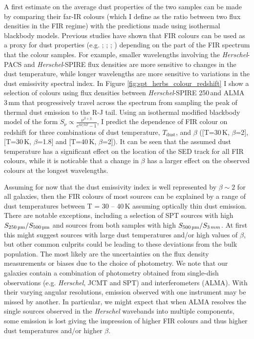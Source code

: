 A first estimate on the average dust properties of the two samples can be made by comparing their far-IR colours (which I define as the ratio between two flux densities in the FIR regime) with the predictions made using isothermal blackbody models. Previous studies have shown that FIR colours can be used as a proxy for dust properties (e.g. \citealt{Boselli_2010}; \citealt{Boselli_2012}; \citealt{Remy-Ruyer_2013}; \citealt{Smith_2019}) depending on the part of the FIR spectrum that the colour samples. For example, smaller wavelengths involving the \textit{Herschel}-PACS and \textit{Herschel}-SPIRE flux densities are more sensitive to changes in the dust temperature, while longer wavelengths are more sensitive to variations in the dust emissivity spectral index. In Figure \ref{fig:spt_herbs_colour_redshift} I show a selection of colours using flux densities between \textit{Herschel}-SPIRE 250\,\micron and ALMA 3\,mm that progressively travel across the spectrum from sampling the peak of thermal dust emission to the R-J tail. Using an isothermal modified blackbody model of the form $S_\nu \propto \frac{\nu^{\beta+3}}{e^{h \nu/kT} - 1}$, I predict the dependence of FIR colour on redshift for three combinations of dust temperature, $T_{\textrm{dust}}$, and $\beta$ ([T=30\,K, $\beta$=2], [T=30\,K, $\beta$=1.8] and [T=40\,K, $\beta$=2]). It can be seen that the assumed dust temperature has a significant effect on the location of the SED track for all FIR colours, while it is noticable that a change in $\beta$ has a larger effect on the observed colours at the longest wavelengths. 

Assuming for now that the dust emissivity index is well represented by $\beta \sim 2$ for all galaxies, then the FIR colours of most sources can be explained by a range of dust temperatures between T = 30 -- 40\,K assuming optically thin dust emission. There are notable exceptions, including a selection of SPT sources with high $S_{250\,\textrm{\micron}}/S_{500\,\textrm{\micron}}$  and sources from both samples with high $S_{500\,\textrm{\micron}}/S_{3\,mm}$. At first this might suggest sources with large dust temperatures and/or high values of $\beta$, but other common culprits could be leading to these deviations from the bulk population. The most likely are the uncertainties on the flux density measurements or biases due to the choice of photometry. We note that our galaxies contain a combination of photometry obtained from single-dish observations (e.g. \textit{Herschel}, JCMT and SPT) and interferometers (ALMA). With their varying angular resolutions, emission observed with one instrument may be missed by another. In particular, we might expect that when ALMA resolves the single sources observed in the \textit{Herschel} wavebands into multiple components, some emission is lost giving the impression of higher FIR colours and thus higher dust temperatures and/or higher $\beta$.

